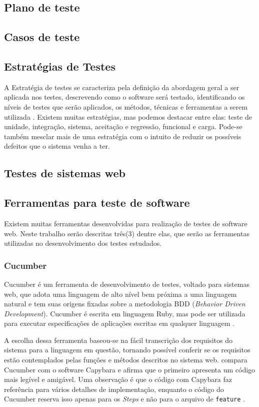 \documentclass[tg]{mdtufsm}
\begin{document}
\subsection{Plano de teste}
\subsection{Casos de teste}

\subsection{Estratégias de Testes}
A Estratégia de testes se caracteriza pela definição da abordagem geral a ser aplicada nos testes, descrevendo como o software será testado, identificando os níveis de testes que serão aplicados, os métodos,
técnicas e ferramentas a serem utilizada \cite{rios2006teste}. Existem muitas estratégias, mas podemos destacar entre elas: teste de unidade, integração, sistema, aceitação e regressão, funcional e carga. Pode-se também
mesclar mais de uma estratégia com o intuito de reduzir os possíveis defeitos que o sistema venha a ter.

\subsection{Testes de sistemas web}

\subsection{Ferramentas para teste de software}
Existem muitas ferramentas desenvolvidas para realização de testes de software web. Neste trabalho serão descritas três(3) dentre elas, que serão as ferramentas utilizadas no desenvolvimento dos testes estudados.

\subsubsection{Cucumber}
Cucumber é um ferramenta de desenvolvimento de testes, voltado para sistemas web, que adota uma linguagem de alto nível bem próxima a uma linguagem natural e tem suas origens fixadas sobre a metodologia BDD (\emph{Behavior Driven Development}). Cucumber
é escrita em linguagem Ruby, mas pode ser utilizada para executar especificações de aplicações escritas em qualquer linguagem \cite{nunescucumber}.

A escolha dessa ferramenta baseou-se na fácil transcrição dos requisitos do sistema para a linguagem em questão, tornando possível conferir se os requisitos estão contemplados pelas funções e métodos descritos no sistema web.
\citeauthor{lopescucumbervalor}\cite{lopescucumbervalor} compara Cucumber com o software Capybara e afirma que o primeiro apresenta um código mais legível e amigável. Uma observação é que o código com Capybara faz
referência para vários detalhes de implementação, enquanto o código do Cucumber reserva isso apenas para os \emph{Steps} e não para o arquivo de \texttt{feature} \cite{lopescucumbervalor}.
\end{document}

